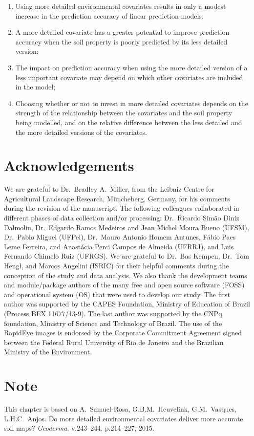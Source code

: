 \begin{enumerate}
 \item Using more detailed environmental covariates results in only a modest increase in the prediction 
accuracy of linear prediction models;
 
 \item A more detailed covariate has a greater potential to improve prediction accuracy when the soil property 
is poorly predicted by its less detailed version;
 
 \item The impact on prediction accuracy when using the more detailed version of a less important covariate 
may depend on which other covariates are included in the model;
 
 \item Choosing whether or not to invest in more detailed covariates depends on the strength of the 
relationship between the covariates and the soil property being modelled, and on the relative difference 
between the less detailed and the more detailed versions of the covariates.
\end{enumerate}

\section*{Acknowledgements}

We are grateful to Dr.~Bradley A.~Miller, from the Leibniz Centre for Agricultural Landscape Research, 
M\"uncheberg, Germany, for his comments during the revision of the manuscript. The following colleagues 
collaborated in different phases of data collection and/or processing: Dr.~Ricardo Simão Diniz Dalmolin, 
Dr.~Edgardo Ramos Medeiros and Jean Michel Moura Bueno (UFSM), Dr.~Pablo Miguel (UFPel), Dr.~Mauro Antonio 
Homem Antunes, Fábio Paes Leme Ferreira, and Anastácia Perci Campos de Almeida (UFRRJ), and Luis Fernando 
Chimelo Ruiz (UFRGS). We are grateful to Dr.~Bas Kempen, Dr.~Tom Hengl, and Marcos Angelini (ISRIC) for their 
helpful comments during the conception of the study and data analysis. We also thank the development teams and 
module/package authors of the many free and open source software (FOSS) and operational system (OS) that were 
used to develop our study. The first author was supported by the CAPES Foundation, Ministry of Education of 
Brazil (Process BEX 11677/13-9). The last author was supported by the CNPq foundation, Ministry of Science and 
Technology of Brazil. The use of the RapidEye images is endorsed by the Corporate Commitment Agreement signed 
between the Federal Rural University of Rio de Janeiro and the Brazilian Ministry of the Environment.

\section*{Note}
This chapter is based on A.~Samuel-Rosa, G.B.M.~Heuvelink, G.M.~Vasques, L.H.C.~Anjos. Do more detailed 
environmental covariates deliver more accurate soil maps? \textit{Geoderma}, v.243--244, p.214--227, 2015.
